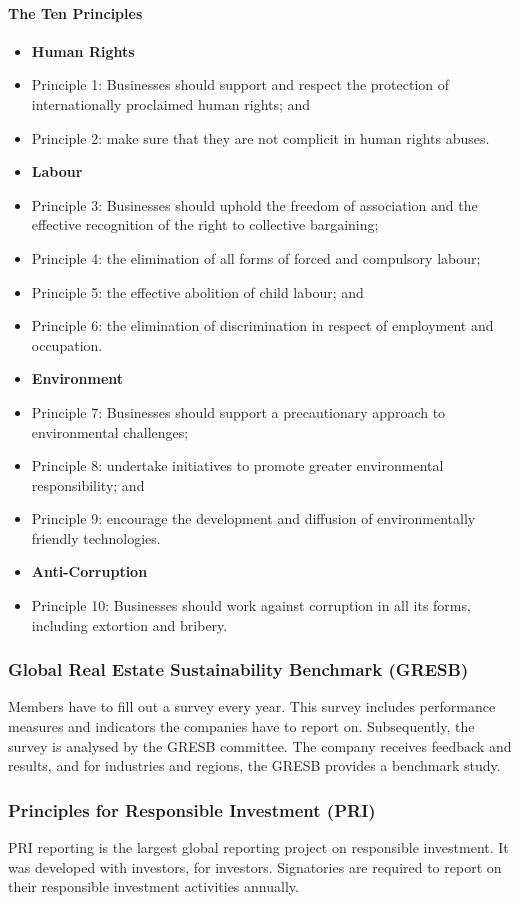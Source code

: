 \documentclass[11pt]{article}
\theoremstyle{definition}
\begin{document}
\paragraph{The Ten Principles}
\begin{itemize}
	\item[] \textbf{Human Rights}
	\item Principle 1: Businesses should support and respect the protection of internationally proclaimed human rights; and
	\item Principle 2: make sure that they are not complicit in human rights abuses.
	\item[] \textbf{Labour}
	\item Principle 3: Businesses should uphold the freedom of association and the effective recognition of the right to collective bargaining;
	\item Principle 4: the elimination of all forms of forced and compulsory labour;
	\item Principle 5: the effective abolition of child labour; and
	\item Principle 6: the elimination of discrimination in respect of employment and occupation.
	\item[] \textbf{Environment}
	\item Principle 7: Businesses should support a precautionary approach to environmental challenges;
	\item Principle 8: undertake initiatives to promote greater environmental responsibility; and
	\item Principle 9: encourage the development and diffusion of environmentally friendly technologies.
	\item[] \textbf{Anti-Corruption}
	\item Principle 10: Businesses should work against corruption in all its forms, including extortion and bribery.
\end{itemize}

\subsubsection{Global Real Estate Sustainability Benchmark (GRESB)}
Members have to fill out a survey every year. This survey includes performance measures and indicators the companies have to report on. Subsequently, the survey is analysed by the GRESB committee. The company receives feedback and results, and for industries and regions, the GRESB provides a benchmark study.

\subsubsection{Principles for Responsible Investment (PRI)}
PRI reporting is the largest global
reporting project on responsible investment. It was developed with investors, for investors. Signatories are required to report on their responsible investment activities annually.
\end{document}
